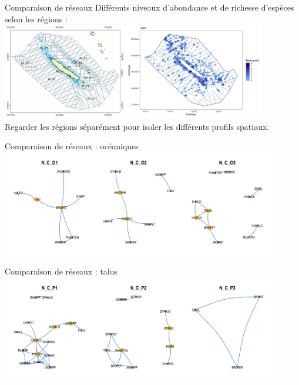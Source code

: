 \documentclass[11pt]{beamer}
\begin{document}

\begin{frame}{Comparaison de réseaux}
Différents niveaux d'abondance et de richesse d'espèces selon les régions :\\
\center
\includegraphics[height=4.2cm]{regionsREMMOA.png}
\includegraphics[height=4.2cm]{biodiv.png}\\
Regarder les régions séparément pour isoler les différents profils spatiaux.
\end{frame}

\begin{frame}{Comparaison de réseaux : océaniques}
\center
\includegraphics[width=12cm]{oceanique.png}\\

\end{frame}

\begin{frame}{Comparaison de réseaux : talus}
\center
\includegraphics[width=12cm]{pente.png}\\
\end{frame}
\end{document}
